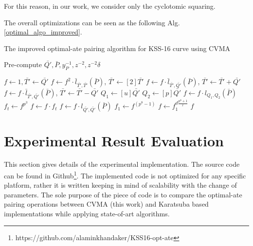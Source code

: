 For this reason, in our work, we consider only the cyclotomic squaring.

The overall optimizations can be seen as the following Alg. \ref{optimal_algo_improved}.

\begin{algorithm}[!h]
	\caption{The improved optimal-ate pairing algorithm for KSS-16 curve using CVMA}
	\label{optimal_algo_improved}
	\DontPrintSemicolon
	\hspace{-3ex}
	\hspace{-3ex}

	\nl Pre-compute $\bar{Q'},\bar{P},y_{P}^{-1}, z^{-2}, z^{-2}\delta$ 
	
	\nl $f \leftarrow 1, \bar{T'} \leftarrow \bar{Q'}$\;
	\nl {} {
		\nl $f\leftarrow f^2\cdot \bar{l}_{\bar{T'},\bar{T'}}(\bar{P}) $, $ \bar{T'} \leftarrow [2] \bar{T'} $ 
		\nl {} {
			\nl $f\leftarrow f\cdot \bar{l}_{\bar{T'},\bar{Q'}}(\bar{P})$, $ \bar{T'} \leftarrow  \bar{T'} + \bar{Q'} $ }
		\nl {} {
			\nl $f\leftarrow f\cdot \bar{l}_{\bar{T'},\bar{Q'}}(\bar{P})$, $ \bar{T'} \leftarrow  \bar{T'} - \bar{Q'} $}} 
	\nl $Q_1\leftarrow [u]\bar{Q'}$  
	\nl $Q_2\leftarrow [p]\bar{Q'}$ 
	\nl $f\leftarrow f\cdot l_{Q_1,Q_2}(\bar{P})$ 
	\nl $f_t\leftarrow f^{p^3}$   
	\nl $f\leftarrow f\cdot f_t$ 
	\nl $f\leftarrow f\cdot l_{\bar{Q'},\bar{Q'}}(\bar{P})$ 
	\nl $f_1\leftarrow f^{(p^{8}-1)}$  
	\nl $f\leftarrow f_1^{d\frac{p^{8}+1}{r}}$  
	 $f$\;
\end{algorithm}


\section{Experimental Result Evaluation}\label{sec:4}
This section gives details of the experimental implementation. 
The source code can be found in Github\footnote{\label{source}https://github.com/alaminkhandaker/KSS16-opt-ate}. 
The implemented code is not optimized for any specific platform, rather it is written keeping in mind of scalability with the change of parameters.
The sole purpose of the piece of code is to compare the optimal-ate pairing operations between CVMA (this work) and Karatsuba based implementations \cite{self_indo17} while applying state-of-art algorithms.

